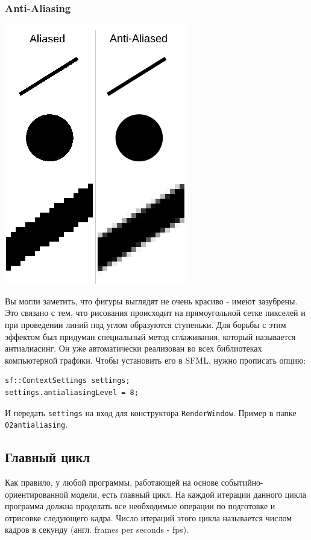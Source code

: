 \documentclass{article}
\begin{document}
\subsubsection*{Anti-Aliasing}
\begin{multicols}{2}
\begin{center}
\includegraphics[scale=0.5]{../images/anti-aliasing.png}
\end{center}
Вы могли заметить, что фигуры выглядят не очень красиво - имеют зазубрены. Это связано с тем, что рисования происходит на прямоугольной сетке пикселей и при проведении линий под углом образуются ступеньки. Для борьбы с этим эффектом был придуман специальный метод сглаживания, который называется антиалиасинг. Он уже автоматически реализован во всех библиотеках компьютерной графики. Чтобы установить его в SFML, нужно прописать опцию:
\begin{lstlisting}
sf::ContextSettings settings;
settings.antialiasingLevel = 8;
\end{lstlisting}
И передать \texttt{settings} на вход для конструктора \texttt{RenderWindow}. Пример в папке \texttt{02antialiasing}.
\end{multicols}

\newpage
\subsection*{Главный цикл}
Как правило, у любой программы, работающей на основе событийно-ориентированной модели, есть главный цикл. На каждой итерации данного цикла программа должна проделать все необходимые операции по подготовке и отрисовке следующего кадра. Число итераций этого цикла называется числом кадров в секунду (англ. frames per seconds - fps).
\end{document}
